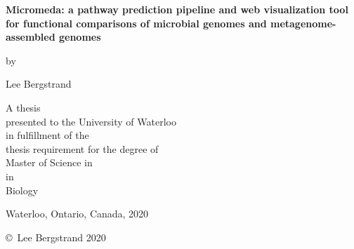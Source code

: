\pagestyle{empty}

\begin{titlepage}
        \begin{center}
        \vspace*{1.0cm}

        \Huge
        {\bf Micromeda: a pathway prediction pipeline and web visualization tool for functional comparisons of microbial genomes and metagenome-assembled genomes}

        \vspace*{1.0cm}

        \normalsize
        by \\

        \vspace*{1.0cm}

        \Large
        Lee Bergstrand \\

        \vspace*{3.0cm}

        \normalsize
        A thesis \\
        presented to the University of Waterloo \\ 
        in fulfillment of the \\
        thesis requirement for the degree of \\
        Master of Science in \\
        in \\
        Biology \\

        \vspace*{2.0cm}

        Waterloo, Ontario, Canada, 2020 \\

        \vspace*{1.0cm}

        \copyright\ Lee Bergstrand 2020 \\
        \end{center}
\end{titlepage}

\pagestyle{plain}
\setcounter{page}{2}

